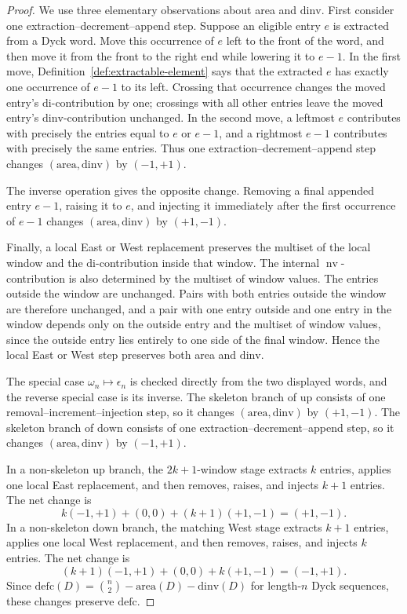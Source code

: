 \documentclass[11pt]{article}
\theoremstyle{plain}
\theoremstyle{definition}
\theoremstyle{remark}
\newcommand{\di}{\mathrm{di}}
\newcommand{\dinv}{\mathrm{dinv}}
\newcommand{\area}{\mathrm{area}}
\newcommand{\defc}{\mathrm{defc}}
\begin{document}
\begin{proof}
We use three elementary observations about area and \(\dinv\).  First consider one
extraction--decrement--append step.  Suppose an eligible entry \(e\) is
extracted from a Dyck word.  Move this occurrence of \(e\) left to the front of
the word, and then move it from the front to the right end while lowering it to
\(e-1\).  In the first move, Definition~\ref{def:extractable-element} says
that the extracted \(e\) has exactly one occurrence of \(e-1\) to its left.
Crossing that occurrence changes the moved entry's \(\di\)-contribution by
one; crossings with all other entries leave the moved entry's
\(\dinv\)-contribution unchanged.  In the second move, a leftmost
\(e\) contributes with precisely the entries equal to \(e\) or \(e-1\), and a
rightmost \(e-1\) contributes with precisely the same entries.  Thus one
extraction--decrement--append step changes \((\area,\dinv)\) by
\((-1,+1)\).

The inverse operation gives the opposite change.  Removing a final appended
entry \(e-1\), raising it to \(e\), and injecting it immediately after the
first occurrence of \(e-1\) changes \((\area,\dinv)\) by \((+1,-1)\).

Finally, a local East or West replacement preserves the multiset of the local
window and the \(\di\)-contribution inside that window.  The internal
\(\operatorname{nv}\)-contribution is also determined by the multiset of window
values.  The entries outside the window are unchanged.  Pairs with both entries
outside the window are therefore unchanged, and a pair with one entry outside
and one entry in the window depends only on the outside entry and the multiset
of window values, since the outside entry lies entirely to one side of the
final window.  Hence the local East or West step preserves both area and
\(\dinv\).

The special case \(\omega_n\mapsto\epsilon_n\) is checked directly from the two
displayed words, and the reverse special case is its inverse.  The skeleton
branch of \(\mathrm{up}\) consists of one removal--increment--injection step, so
it changes \((\area,\dinv)\) by \((+1,-1)\).  The skeleton branch of
\(\mathrm{down}\) consists of one extraction--decrement--append step, so it
changes \((\area,\dinv)\) by \((-1,+1)\).

In a non-skeleton \(\mathrm{up}\) branch, the \(2k+1\)-window stage extracts
\(k\) entries, applies one local East replacement, and then removes, raises,
and injects \(k+1\) entries.  The net change is
\[
  k(-1,+1)+(0,0)+(k+1)(+1,-1)=(+1,-1).
\]
In a non-skeleton \(\mathrm{down}\) branch, the matching West stage extracts
\(k+1\) entries, applies one local West replacement, and then removes, raises,
and injects \(k\) entries.  The net change is
\[
  (k+1)(-1,+1)+(0,0)+k(+1,-1)=(-1,+1).
\]
Since \(\defc(D)=\binom n2-\area(D)-\dinv(D)\) for length-\(n\) Dyck
sequences, these changes preserve \(\defc\).
\end{proof}
\end{document}
